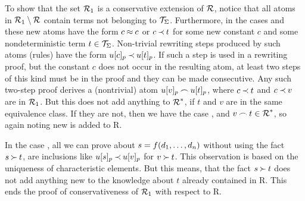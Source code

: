 \begin{PROOF}
To show that the set \(\C R_1\) is a conservative extension of \(\C R\),
notice that all atoms in \(\C R_1\setminus\C R\) contain terms not
belonging to \(\GTerms\). Furthermore, in the cases  and
 these new atoms have the form \(c\Eq c\) or \(c\Incl t\) for some
new constant $c$ and some nondeterministic term \(t\in\GTerms\). Non-trivial
rewriting steps produced by such atoms (rules) have the form \(u[c]_p\Incl
u[t]_p\). If such a step is used in a rewriting proof, but the constant \(c\)
does not occur in the resulting atom, at least two steps of this kind must be
in the proof and they can be made consecutive. Any such two-step proof derives a
(nontrivial) atom \(u[v]_p\Int u[t]_p\), where \(c\Incl t\) and \(c\Incl v\)
are in \(\C R_1\). But this does not add anything to \(\C R^\ast\), if \(t\) and
\(v\) are in the same equivalence class. If they are not, then we have the
case , and \(v\Int t\in\C R^\ast\), so again noting new is added
to \C R. 

In the case , all we can prove about
\(s=f(\List dn,)\) without using the fact \(s\Cont t\), are inclusions like
\(u[s]_p\Incl u[v]_p\) for \(v\Cont t\). This observation is based on the
uniqueness of characteristic elements. But this means, that the fact \(s\Cont
t\) does not add anything new to the knowledge about \(t\) already contained in \C
R. This ends the proof of conservativeness of \(\C R_1\) with respect to \C R.


\end{PROOF}
